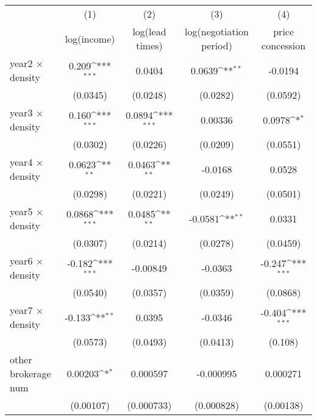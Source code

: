 {
\def\sym#1{\ifmmode^{#1}\else\(^{#1}\)\fi}
\begin{tabular}{l*{4}{c}}
\toprule
            &\multicolumn{1}{c}{(1)}&\multicolumn{1}{c}{(2)}&\multicolumn{1}{c}{(3)}&\multicolumn{1}{c}{(4)}\\
            &\multicolumn{1}{c}{log(income)}&\multicolumn{1}{c}{log(lead times)}&\multicolumn{1}{c}{log(negotiation period)}&\multicolumn{1}{c}{price concession}\\
\midrule
year2 $\times$ density&       0.209\sym{***}&      0.0404         &      0.0639\sym{**} &     -0.0194         \\
            &    (0.0345)         &    (0.0248)         &    (0.0282)         &    (0.0592)         \\
\addlinespace
year3 $\times$ density&       0.160\sym{***}&      0.0894\sym{***}&     0.00336         &      0.0978\sym{*}  \\
            &    (0.0302)         &    (0.0226)         &    (0.0209)         &    (0.0551)         \\
\addlinespace
year4 $\times$ density&      0.0623\sym{**} &      0.0463\sym{**} &     -0.0168         &      0.0528         \\
            &    (0.0298)         &    (0.0221)         &    (0.0249)         &    (0.0501)         \\
\addlinespace
year5 $\times$ density&      0.0868\sym{***}&      0.0485\sym{**} &     -0.0581\sym{**} &      0.0331         \\
            &    (0.0307)         &    (0.0214)         &    (0.0278)         &    (0.0459)         \\
\addlinespace
year6 $\times$ density&      -0.182\sym{***}&    -0.00849         &     -0.0363         &      -0.247\sym{***}\\
            &    (0.0540)         &    (0.0357)         &    (0.0359)         &    (0.0868)         \\
\addlinespace
year7 $\times$ density&      -0.133\sym{**} &      0.0395         &     -0.0346         &      -0.404\sym{***}\\
            &    (0.0573)         &    (0.0493)         &    (0.0413)         &     (0.108)         \\
\addlinespace
other brokerage num  &     0.00203\sym{*}  &    0.000597         &   -0.000995         &    0.000271         \\
            &   (0.00107)         &  (0.000733)         &  (0.000828)         &   (0.00138)         \\

\end{tabular}}
